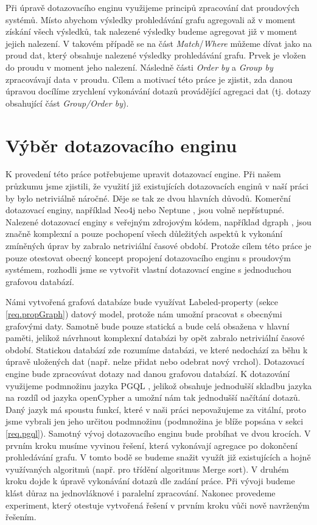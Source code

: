Při úpravě dotazovacího enginu využijeme principů zpracování dat proudových systémů.
Místo abychom výsledky prohledávání grafu agregovali až v moment získání všech výsledků, tak nalezené výsledky budeme agregovat již v moment jejich nalezení.
V takovém případě se na část \textit{Match}/\textit{Where} můžeme dívat jako na proud dat, který obsahuje nalezené výsledky prohledávání grafu.
Prvek je vložen do proudu v moment jeho nalezení.
Následně části \textit{Order by} a \textit{Group by} zpracovávají data v proudu.
Cílem a motivací této práce je zjistit, zda danou úpravou docílíme zrychlení vykonávání dotazů provádějící agregaci dat (tj. dotazy obsahující část \textit{Group/Order by}).

\section*{Výběr dotazovacího enginu}

K provedení této práce potřebujeme upravit dotazovací engine.
Při našem průzkumu jsme zjistili, že využití již existujících dotazovacích enginů v naší práci by bylo netriviálně náročné.
Děje se tak ze dvou hlavních důvodů.
Komerční dotazovací enginy, například Neo4j \citep{neopropertygraph} nebo Neptune \citep{neptune}, jsou volně nepřístupné.
Nalezené dotazovací enginy s veřejným zdrojovým kódem, například dgraph \citep{dgraph}, jsou značně komplexní a pouze pochopení všech důležitých aspektů k vykonání zmíněných úprav by zabralo netriviální časové období.
Protože cílem této práce je pouze otestovat obecný koncept propojení dotazovacího enginu s proudovým systémem, rozhodli jsme se vytvořit vlastní dotazovací engine s jednoduchou grafovou databází.

Námi vytvořená grafová databáze bude využívat Labeled-property (sekce \ref{req.propGraph}) datový model, protože nám umožní pracovat s obecnými grafovými daty.
Samotně bude pouze statická a bude celá obsažena v hlavní paměti, jelikož návrhnout komplexní databázi by opět zabralo netriviální časové období.
Statickou databází zde rozumíme databázi, ve které nedochází za běhu k úpravě uložených dat (např. nelze přidat nebo odebrat nový vrchol).
Dotazovací engine bude zpracovávat dotazy nad danou grafovou databází.
K dotazování využijeme podmnožinu jazyka PGQL \citep{pgql}, jelikož obsahuje jednodušší skladbu jazyka na rozdíl od jazyka openCypher \citep{openCypher} a umožní nám tak jednodušší načítání dotazů.
Daný jazyk má spoustu funkcí, které v naši práci nepovažujeme za vitální, proto jsme vybrali jen jeho určitou podmnožinu (podmnožina je blíže popsána v sekci \ref{req.pgql}).
Samotný vývoj dotazovacího enginu bude probíhat ve dvou krocích.
V prvním kroku musíme vyvinou řešení, která vykonávají agregace po dokončení prohledávání grafu.
V tomto bodě se budeme snažit využít již existujících a hojně využívaných algoritmů (např. pro třídění algoritmus Merge sort). 
V druhém kroku dojde k úpravě vykonávání dotazů dle zadání práce.
Při vývoji budeme klást důraz na jednovláknové i paralelní zpracování.
Nakonec provedeme experiment, který otestuje vytvořená řešení v prvním kroku vůči nově navrženým řešením.

